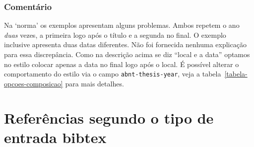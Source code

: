 \documentclass[espacosimples]{abnt}
\begin{document}
\subsection{Comentário}
Na `norma' os exemplos  apresentam alguns
problemas. Ambos repetem o ano \emph{duas} vezes, a primeira logo após o título
e a segunda no final. O exemplo  inclusive apresenta
duas datas diferentes.
Não foi fornecida nenhuma explicação para essa discrepância.
Como na descrição acima se diz ``local e a data'' optamos no estilo colocar
apenas a data no final logo após o local.
É possível alterar o comportamento do estilo via o campo {\tt abnt-thesis-year},
veja a tabela~\ref{tabela-opcoes-composicao} para mais detalhes.


\chapter{Referências segundo o tipo de entrada bibtex}
\end{document}
